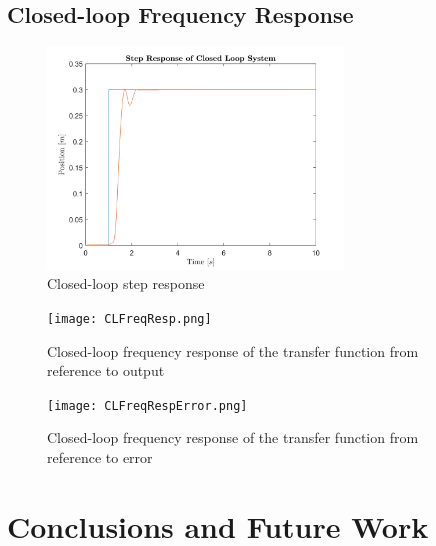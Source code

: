 \documentclass[11pt]{article}
\begin{document}
\subsection{Closed-loop Frequency Response}


\begin{figure}[!ht]
\centering
\includegraphics[width=0.7\textwidth]{CLStepResponse.png}
\caption{Closed-loop step response}
\label{fig:CLStepResponse}
\end{figure}


\begin{figure}[!ht]
\centering
\texttt{[image: CLFreqResp.png]}
\caption{Closed-loop frequency response of the transfer function from reference to output}
\label{fig:CLFreqResponse}
\end{figure}




\begin{figure}[!ht]
\centering
\texttt{[image: CLFreqRespError.png]}
\caption{Closed-loop frequency response of the transfer function from reference to error}
\label{fig:CLFreqResponseError}
\end{figure}



\section{Conclusions and Future Work}

\begin{thebibliography}{9}
\end{thebibliography}
\end{document}
